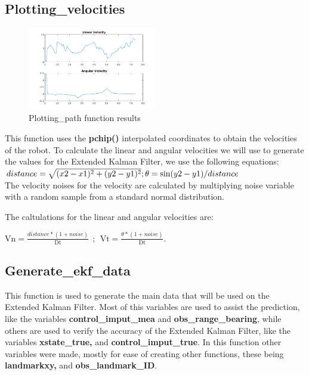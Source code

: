 \documentclass[runningheads]{llncs}
\begin{document}
\subsection*{Plotting\_velocities}

\begin{figure}
    \centering
    \includegraphics[width=0.5\textwidth]{plotting_velocities.png}
    \caption{Plotting\_path function results}
    \label{plotting_vel_fig}
\end{figure}

This function uses the \textbf{pchip()} interpolated coordinates to obtain the velocities of the robot. 
To calculate the linear and angular velocities we will use to generate the values for the Extended Kalman Filter, we use the following equations:
\\
\begin{math}
    distance=\sqrt{(x2-x1)^2+(y2-y1)^2} \\  ;  \theta=\sin(y2-y1)/distance
\end{math}
\\
The velocity noises for the velocity are calculated by multiplying noise variable with a random sample from a standard normal distribution.

The caltulations for the linear and angular velocities are:
\begin{center}    
    \begin{math}
        \mathrm{Vn}=\frac{distance*(1+noise)}{\mathrm{Dt}} \ \ ; \ \ \mathrm{Vt}=\frac{\theta*(1+noise)}{\mathrm{Dt}}
    \end{math}.
\end{center}




\subsection*{Generate\_ekf\_data}
This function is used to generate the main data that will be used on the Extended Kalman Filter. 
Most of this variables are used to assist the prediction, like the variables \textbf{control\_imput\_mea} and \textbf{obs\_range\_bearing}, 
while others are used to verify the accuracy of the Extended Kalman Filter, like the variables \textbf{xstate\_true,} and \textbf{control\_imput\_true}.  
In this function other variables were made, mostly for ease of creating other functions, these being \textbf{landmarkxy,} and \textbf{obs\_landmark\_ID}.
\end{document}
